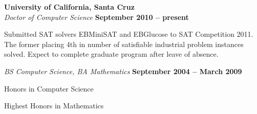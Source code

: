 \documentclass[margin,line]{resume}
\begin{document}
\begin{resume}
    \textbf{University of California, Santa Cruz} \vspace{2mm}\\\vspace{1mm}%
    \textsl{Doctor of Computer Science} \hfill \textbf{ September 2010 -- present}\vspace{-3mm}\\\vspace{-1mm}%
    \begin{mylist}
        \item Submitted SAT solvers EBMiniSAT and EBGlucose to SAT Competition 2011.
            The former placing 4th in number of satisfiable industrial problem instances solved.
            Expect to complete graduate program after leave of absence.
    \end{mylist}\vspace{-1.5mm}
    \textsl{BS Computer Science, BA Mathematics} \hfill \textbf{September 2004 -- March 2009}\vspace{-3mm}\\\vspace{-1mm}%
    \begin{mylist}
        \item Honors in Computer Science
        \item Highest Honors in Mathematics
    \end{mylist}


%


\end{resume}
\end{document}
